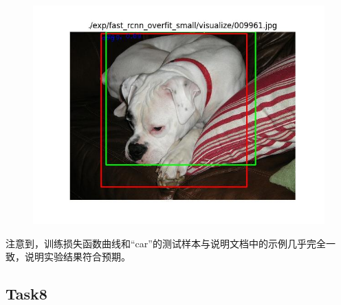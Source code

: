 \documentclass{article}%
\begin{document}
\begin{figure}[H]
    \centering
	\begin{minipage}{0.32\linewidth}
		\centering
		\includegraphics[width=0.9\linewidth]{fast_rcnn_overfit_small/visualize/009961.jpg}
	\end{minipage}
\end{figure}

注意到，训练损失函数曲线和“car”的测试样本与说明文档中的示例几乎完全一致，说明实验结果符合预期。

\subsection{Task8}
\end{document}
